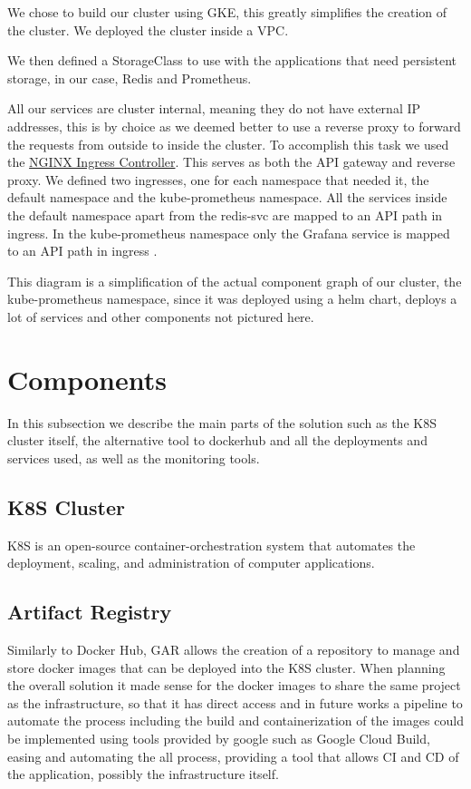 \documentclass[12pt,a4paper,oneside]{report}
\begin{document}
We chose to build our cluster using \ac{GKE}, this greatly simplifies the creation of the cluster. We deployed the cluster inside a \ac{VPC}.

We then defined a StorageClass to use with the applications that need persistent storage, in our case, Redis and Prometheus.

All our services are cluster internal, meaning they do not have external \ac{IP} addresses, this is by choice as we deemed better to use a reverse proxy to forward the requests from outside to inside the cluster. To accomplish this task we used the \href{https://kubernetes.github.io/ingress-nginx/}{NGINX Ingress Controller}. This serves as both the \ac{API} gateway and reverse proxy. We defined two ingresses, one for each namespace that needed it, the default namespace and the kube-prometheus namespace.
All the services inside the default namespace apart from the redis-svc are mapped to an \ac{API} path in ingress.
In the kube-prometheus namespace only the Grafana service is mapped to an \ac{API} path in ingress .

This diagram is a simplification of the actual component graph of our cluster, the kube-prometheus namespace, since it was deployed using a helm chart, deploys a lot of services and other components not pictured here.

\section{Components} 

In this subsection we describe the main parts of the solution such as the \ac{K8S} cluster itself, the alternative tool to dockerhub and all the deployments and services used, as well as the monitoring tools.

\subsection{K8S Cluster}
\ac{K8S} is an open-source container-orchestration system that automates the deployment, scaling, and administration of computer applications. 

\subsection{Artifact Registry}
Similarly to Docker Hub, \ac{GAR} allows the creation of a repository to manage and store docker images that can be deployed into the \ac{K8S} cluster. When planning the overall solution it made sense for the docker images to share the same project as the infrastructure, so that it has direct access and in future works a pipeline to automate the process including the build and containerization of the images could be implemented using tools provided by google such as Google Cloud Build, easing and automating the all process, providing a tool that allows \ac{CI} and \ac{CD} of the application, possibly the infrastructure itself.
\end{document}
